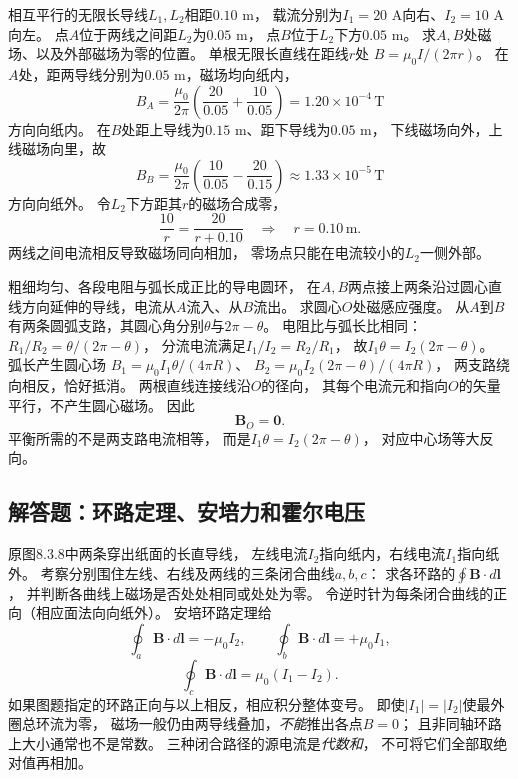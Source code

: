 \problemtext 相互平行的无限长导线$L_1,L_2$相距$0.10$ m，
载流分别为$I_1=20$ A向右、$I_2=10$ A向左。
点$A$位于两线之间距$L_2$为$0.05$ m，
点$B$位于$L_2$下方$0.05$ m。
求$A,B$处磁场、以及外部磁场为零的位置。
\workings
单根无限长直线在距线$r$处
$B=\mu_0I/(2\pi r)$。
在$A$处，距两导线分别为$0.05$ m，磁场均向纸内，
\[
\boxed{B_A=\frac{\mu_0}{2\pi}
\left(\frac{20}{0.05}+\frac{10}{0.05}\right)
=1.20\times10^{-4}\,\mathrm T}
\]
方向向纸内。
在$B$处距上导线为$0.15$ m、距下导线为$0.05$ m，
下线磁场向外，上线磁场向里，故
\[
\boxed{B_B=\frac{\mu_0}{2\pi}
\left(\frac{10}{0.05}-\frac{20}{0.15}\right)
\approx1.33\times10^{-5}\,\mathrm T}
\]
方向向纸外。
令$L_2$下方距其$r$的磁场合成零，
\[
\frac{10}{r}=\frac{20}{r+0.10}
\quad\Longrightarrow\quad
\boxed{r=0.10\,\mathrm m}.
\]
\crosscheck 两线之间电流相反导致磁场同向相加，
零场点只能在电流较小的$L_2$一侧外部。

\problemtext 粗细均匀、各段电阻与弧长成正比的导电圆环，
在$A,B$两点接上两条沿过圆心直线方向延伸的导线，电流从$A$流入、从$B$流出。
求圆心$O$处磁感应强度。
\workings
从$A$到$B$有两条圆弧支路，其圆心角分别$\theta$与$2\pi-\theta$。
电阻比与弧长比相同：
$R_1/R_2=\theta/(2\pi-\theta)$，
分流电流满足$I_1/I_2=R_2/R_1$，
故$I_1\theta=I_2(2\pi-\theta)$。
弧长产生圆心场
$B_1=\mu_0I_1\theta/(4\pi R)$、
$B_2=\mu_0I_2(2\pi-\theta)/(4\pi R)$，
两支路绕向相反，恰好抵消。
两根直线连接线沿$O$的径向，
其每个电流元和指向$O$的矢量平行，不产生圆心磁场。
因此
\[
\boxed{\bm B_O=\bm0}.
\]
\crosscheck 平衡所需的不是两支路电流相等，
而是$I_1\theta=I_2(2\pi-\theta)$，
对应中心场等大反向。


\subsection{解答题：环路定理、安培力和霍尔电压}

\problemtext 原图8.3.8中两条穿出纸面的长直导线，
左线电流$I_2$指向纸内，右线电流$I_1$指向纸外。
考察分别围住左线、右线及两线的三条闭合曲线$a,b,c$：
求各环路的$\oint\bm B\cdot d\bm l$，
并判断各曲线上磁场是否处处相同或处处为零。
\workings
令逆时针为每条闭合曲线的正向（相应面法向向纸外）。
安培环路定理给
\[
\boxed{\oint_a\bm B\cdot d\bm l=-\mu_0I_2},\qquad
\boxed{\oint_b\bm B\cdot d\bm l=+\mu_0I_1},
\]
\[
\boxed{\oint_c\bm B\cdot d\bm l=\mu_0(I_1-I_2)}.
\]
如果图题指定的环路正向与以上相反，相应积分整体变号。
即使$|I_1|=|I_2|$使最外圈总环流为零，
磁场一般仍由两导线叠加，\emph{不能}推出各点$B=0$；
且非同轴环路上大小通常也不是常数。
\crosscheck 三种闭合路径的源电流是\emph{代数和}，
不可将它们全部取绝对值再相加。

